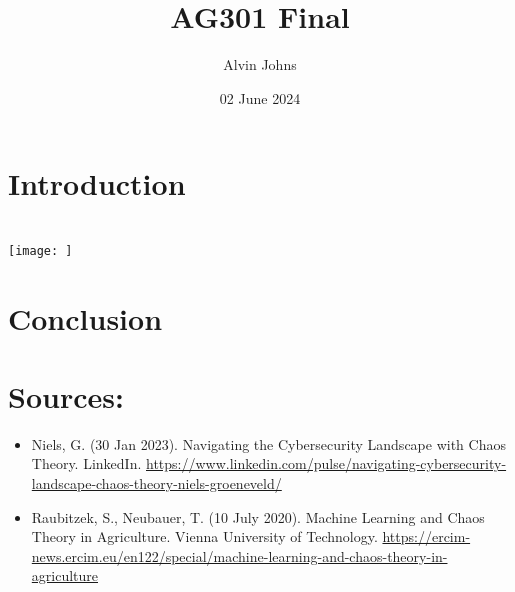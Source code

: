 \documentclass{article}
\title{AG301 Final}
\author{Alvin Johns}
\date{02 June 2024}
\begin{document}
\maketitle

\raggedright

\section*{Introduction}


\section*{}


\texttt{[image: ]}
\begin{center}
    \textit{\small \large}
\end{center}

\section*{}

\section*{Conclusion}

\newpage

\section*{Sources:}

\small
\begin{itemize}
    \sloppy
    \item Niels, G. (30 Jan 2023). Navigating the Cybersecurity Landscape with Chaos Theory. LinkedIn.
    \url{https://www.linkedin.com/pulse/navigating-cybersecurity-landscape-chaos-theory-niels-groeneveld/}
    \item Raubitzek, S., Neubauer, T. (10 July 2020). Machine Learning and Chaos Theory in Agriculture. Vienna University of Technology.
    \url{https://ercim-news.ercim.eu/en122/special/machine-learning-and-chaos-theory-in-agriculture} 
\end{itemize}
\end{document}
